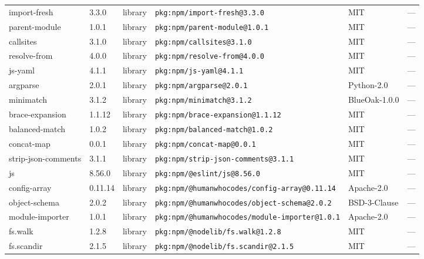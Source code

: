 \documentclass[11pt,a4paper]{article}
\begin{document}
\begin{longtable}{|p{4cm}|p{2cm}|p{1.6cm}|p{5cm}|p{1.5cm}|p{3.5cm}|}
\raggedright import-fresh & 3.3.0 & library & \small\texttt{pkg:npm/import-fresh@3.3.0} & MIT & \small — \\
\raggedright parent-module & 1.0.1 & library & \small\texttt{pkg:npm/parent-module@1.0.1} & MIT & \small — \\
\raggedright callsites & 3.1.0 & library & \small\texttt{pkg:npm/callsites@3.1.0} & MIT & \small — \\
\raggedright resolve-from & 4.0.0 & library & \small\texttt{pkg:npm/resolve-from@4.0.0} & MIT & \small — \\
\raggedright js-yaml & 4.1.1 & library & \small\texttt{pkg:npm/js-yaml@4.1.1} & MIT & \small — \\
\raggedright argparse & 2.0.1 & library & \small\texttt{pkg:npm/argparse@2.0.1} & Python-2.0 & \small — \\
\raggedright minimatch & 3.1.2 & library & \small\texttt{pkg:npm/minimatch@3.1.2} & BlueOak-1.0.0 & \small — \\
\raggedright brace-expansion & 1.1.12 & library & \small\texttt{pkg:npm/brace-expansion@1.1.12} & MIT & \small — \\
\raggedright balanced-match & 1.0.2 & library & \small\texttt{pkg:npm/balanced-match@1.0.2} & MIT & \small — \\
\raggedright concat-map & 0.0.1 & library & \small\texttt{pkg:npm/concat-map@0.0.1} & MIT & \small — \\
\raggedright strip-json-comments & 3.1.1 & library & \small\texttt{pkg:npm/strip-json-comments@3.1.1} & MIT & \small — \\
\raggedright js & 8.56.0 & library & \small\texttt{pkg:npm/@eslint/js@8.56.0} & MIT & \small — \\
\raggedright config-array & 0.11.14 & library & \small\texttt{pkg:npm/@humanwhocodes/config-array@0.11.14} & Apache-2.0 & \small — \\
\raggedright object-schema & 2.0.2 & library & \small\texttt{pkg:npm/@humanwhocodes/object-schema@2.0.2} & BSD-3-Clause & \small — \\
\raggedright module-importer & 1.0.1 & library & \small\texttt{pkg:npm/@humanwhocodes/module-importer@1.0.1} & Apache-2.0 & \small — \\
\raggedright fs.walk & 1.2.8 & library & \small\texttt{pkg:npm/@nodelib/fs.walk@1.2.8} & MIT & \small — \\
\raggedright fs.scandir & 2.1.5 & library & \small\texttt{pkg:npm/@nodelib/fs.scandir@2.1.5} & MIT & \small — \\

\end{longtable}
\end{document}
